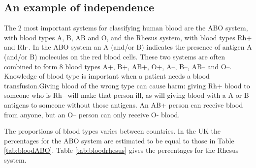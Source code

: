 \documentclass[
  11pt,
  british,
  openany, a4paper]{book}
\begin{document}
\hypertarget{bloodindep}{%
\subsection{An example of independence}\label{bloodindep}}

The 2 most important systems for classifying human blood are the ABO system, with blood types A, B, AB and O, and the Rhesus system, with blood types Rh+ and Rh-. In the ABO system an A (and/or B) indicates the presence of antigen A (and/or B) molecules on the red blood cells. These two systems are often combined to form 8 blood types A+, B+, AB+, O+, A--, B--, AB-- and O--. Knowledge of blood type is important when a patient needs a blood transfusion.Giving blood of the wrong type can cause harm: giving Rh+ blood to someone who is Rh-- will make that person ill, as will giving blood with a A or B antigens to someone without those antigens. An AB+ person can receive blood from anyone, but an O-- person can only receive O- blood.

The proportions of blood types varies between countries. In the UK the percentages for the ABO system are estimated to be equal to those in Table \ref{tab:bloodABO}. Table \ref{tab:bloodrhesus} gives the percentages for the Rhesus system.

 
  \providecommand{\huxb}[2]{\arrayrulecolor[RGB]{#1}\global\arrayrulewidth=#2pt}
  \providecommand{\huxvb}[2]{\color[RGB]{#1}\vrule width #2pt}
  \providecommand{\huxtpad}[1]{\rule{0pt}{#1}}
  \providecommand{\huxbpad}[1]{\rule[-#1]{0pt}{#1}}
\end{document}
